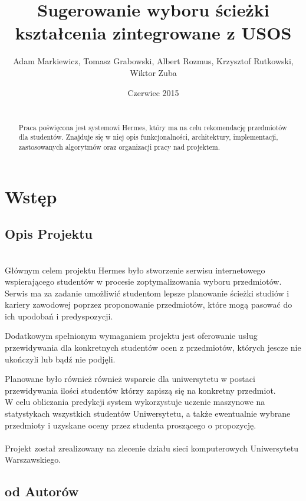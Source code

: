 \documentclass[licencjacka]{pracamgr}
\author{ Adam Markiewicz, Tomasz Grabowski, Albert Rozmus, Krzysztof Rutkowski, Wiktor Zuba}
\title{Sugerowanie wyboru ścieżki kształcenia zintegrowane z USOS}
\date{Czerwiec 2015}
\begin{document}
\maketitle
\begin{abstract} ~\\ \indent
Praca poświęcona jest systemowi Hermes, który ma na celu rekomendację przedmiotów dla studentów. Znajduje się w niej opis funkcjonalności, architektury, implementacji, zastosowanych algorytmów oraz organizacji pracy nad projektem.
\end{abstract}
\tableofcontents
\chapter{Wstęp}


 \section{Opis Projektu}


~\\ \indent Głównym celem projektu Hermes było stworzenie serwisu internetowego 
wspierającego studentów w procesie zoptymalizowania wyboru przedmiotów.
Serwis ma za zadanie 
umożliwić studentom lepsze planowanie ścieżki studiów i kariery zawodowej
poprzez proponowanie przedmiotów, które mogą pasować do ich upodobań i predyspozycji. 

Dodatkowym spełnionym wymaganiem projektu jest oferowanie usług przewidywania dla konkretnych studentów ocen z przedmiotów, których jescze nie ukończyli lub bądź nie podjęli.

Planowane było również również wsparcie dla uniwersytetu w postaci
przewidywania ilości studentów którzy zapiszą się na konkretny przedmiot. \\
\indent W celu obliczania predykcji system wykorzystuje uczenie maszynowe na statystykach wszystkich studentów Uniwersytetu, a także ewentualnie wybrane przedmioty i uzyskane oceny przez studenta proszącego o propozycję. \\ \\
\indent Projekt został zrealizowany na zlecenie działu sieci komputerowych Uniwersytetu Warszawskiego.
\newpage
\section{od Autorów}
\end{document}
